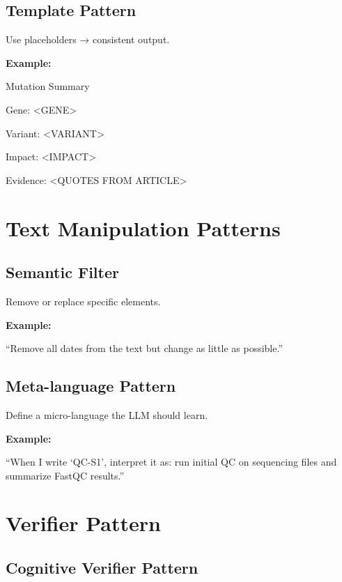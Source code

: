 \documentclass[
  letterpaper,
  DIV=11,
  numbers=noendperiod]{scrreprt}
\begin{document}
\subsection{Template Pattern}\label{template-pattern}

Use placeholders → consistent output.

\textbf{Example:}

Mutation Summary

Gene: \textless GENE\textgreater{}

Variant: \textless VARIANT\textgreater{}

Impact: \textless IMPACT\textgreater{}

Evidence: \textless QUOTES FROM ARTICLE\textgreater{}

\section{Text Manipulation Patterns}\label{text-manipulation-patterns}

\subsection{Semantic Filter}\label{semantic-filter}

Remove or replace specific elements.

\textbf{Example:}

``Remove all dates from the text but change as little as possible.''

\subsection{Meta-language Pattern}\label{meta-language-pattern}

Define a micro-language the LLM should learn.

\textbf{Example:}

``When I write `QC-S1', interpret it as: run initial QC on sequencing
files and summarize FastQC results.''

\section{Verifier Pattern}\label{verifier-pattern}

\subsection{Cognitive Verifier
Pattern}\label{cognitive-verifier-pattern}
\end{document}
